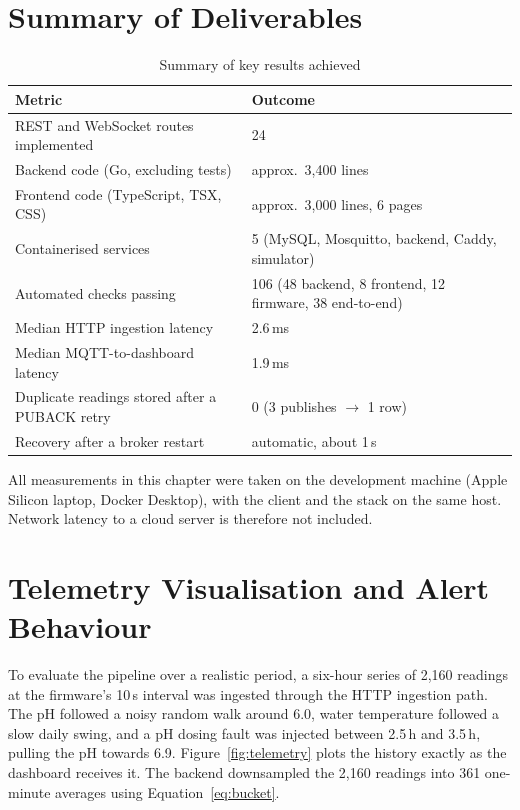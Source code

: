 \documentclass[11pt,a4paper,oneside]{report}
\begin{document}
\section{Summary of Deliverables}
\begin{table}[htbp]
\centering
\caption{Summary of key results achieved}
\label{tab:results}
\small
\begin{tabularx}{\linewidth}{@{}X l@{}}
\toprule
\textbf{Metric} & \textbf{Outcome} \\
\midrule
REST and WebSocket routes implemented                 & 24 \\
Backend code (Go, excluding tests)                    & approx.\ 3,400 lines \\
Frontend code (TypeScript, TSX, CSS)                  & approx.\ 3,000 lines, 6 pages \\
Containerised services                                & 5 (MySQL, Mosquitto, backend, Caddy, simulator) \\
Automated checks passing                              & 106 (48 backend, 8 frontend, 12 firmware, 38 end-to-end) \\
Median HTTP ingestion latency                         & 2.6\,ms \\
Median MQTT-to-dashboard latency                      & 1.9\,ms \\
Duplicate readings stored after a PUBACK retry        & 0 (3 publishes $\rightarrow$ 1 row) \\
Recovery after a broker restart                       & automatic, about 1\,s \\
\bottomrule
\end{tabularx}
\end{table}

All measurements in this chapter were taken on the development machine (Apple Silicon
laptop, Docker Desktop), with the client and the stack on the same host. Network latency
to a cloud server is therefore not included.

\section{Telemetry Visualisation and Alert Behaviour}
To evaluate the pipeline over a realistic period, a six-hour series of 2,160 readings
at the firmware's 10\,s interval was ingested through the HTTP ingestion path. The pH
followed a noisy random walk around 6.0, water temperature followed a slow daily swing,
and a pH dosing fault was injected between 2.5\,h and 3.5\,h, pulling the pH towards 6.9.
Figure~\ref{fig:telemetry} plots the history exactly as the dashboard receives it. The
backend downsampled the 2,160 readings into 361 one-minute averages using
Equation~\ref{eq:bucket}.
\end{document}
